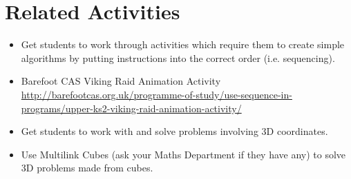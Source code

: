 \documentclass{geocraft-lesson-plan}
\begin{document}
\section*{Related Activities}
\begin{itemize}
\item Get students to work through activities which require them to create simple algorithms by putting instructions
  into the correct order (i.e. sequencing).
\item Barefoot CAS Viking Raid Animation Activity
  {\textcolor{greenish}
    {\url{http://barefootcas.org.uk/programme-of-study/use-sequence-in-programs/upper-ks2-viking-raid-animation-activity/}}}
\item Get students to work with and solve problems involving 3D coordinates.
\item Use Multilink Cubes (ask your Maths Department if they have any) to solve 3D problems made from cubes.
\end{itemize}
\end{document}
